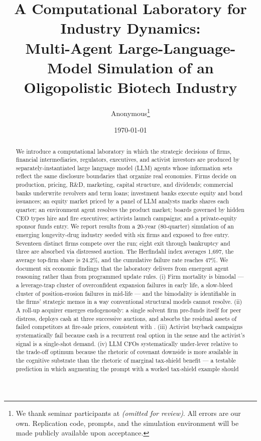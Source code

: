 \documentclass[11pt]{article}
\title{\Large \textbf{A Computational Laboratory for Industry Dynamics:\\
Multi-Agent Large-Language-Model Simulation of an Oligopolistic Biotech Industry}}
\author{\normalsize Anonymous\thanks{We thank seminar participants at \textit{(omitted for review)}.
All errors are our own. Replication code, prompts, and the simulation environment
will be made publicly available upon acceptance.}}
\date{\normalsize \today}
\begin{document}
\maketitle

\begin{abstract}
\noindent We introduce a computational laboratory in which the strategic
decisions of firms, financial intermediaries, regulators, executives, and
activist investors are produced by separately-instantiated large language
model (LLM) agents whose information sets reflect the same disclosure
boundaries that organize real economies. Firms decide on production,
pricing, R\&D, marketing, capital structure, and dividends; commercial banks
underwrite revolvers and term loans; investment banks execute equity and
bond issuances; an equity market priced by a panel of LLM analysts marks
shares each quarter; an environment agent resolves the product market;
boards governed by hidden CEO types hire and fire executives; activists
launch campaigns; and a private-equity sponsor funds entry. We report
results from a 20-year (80-quarter) simulation of an emerging longevity-drug
industry seeded with six firms and exposed to free entry. Seventeen distinct
firms compete over the run; eight exit through bankruptcy and three are
absorbed via distressed auction. The Herfindahl index averages 1{,}697,
the average top-firm share is 24.2\%, and the cumulative failure rate
reaches 47\%. We document six economic findings that the laboratory delivers from
emergent agent reasoning rather than from programmed update rules.
(i) Firm mortality is bimodal — a leverage-trap cluster of overconfident
expansion failures in early life, a slow-bleed cluster of position-erosion
failures in mid-life — and the bimodality is identifiable in the firms'
strategic memos in a way conventional structural models cannot resolve.
(ii) A roll-up acquirer emerges endogenously: a single solvent firm
pre-funds itself for peer distress, deploys cash at three successive
auctions, and absorbs the residual assets of failed competitors at
fire-sale prices, consistent with \citet{shleifervishny1992}.
(iii) Activist buyback campaigns systematically fail because cash is a
recurrent real option in the \citet{dixitpindyck1994} sense and the
activist's signal is a single-shot demand. (iv) LLM CFOs systematically
under-lever relative to the trade-off optimum because the rhetoric of
covenant downside is more available in the cognitive substrate than
the rhetoric of marginal tax-shield benefit — a testable prediction in
which augmenting the prompt with a worked tax-shield example should

\end{abstract}
\end{document}
